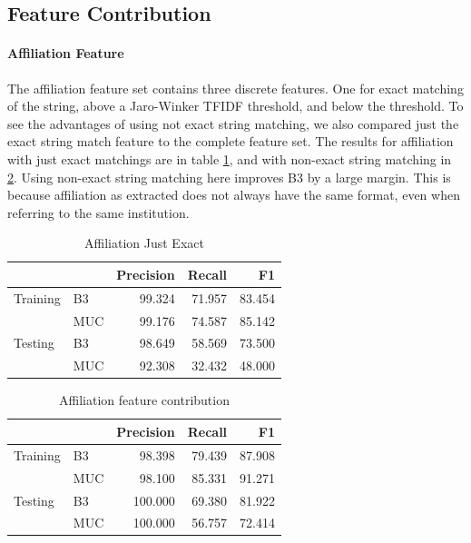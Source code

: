 \documentclass[twocolumn,letterpaper]{article}
\begin{document}
\subsection{Feature Contribution} %
\label{sub:feature_contribution}
\paragraph{Affiliation Feature} %
\label{par:affiliation_feature}
The affiliation feature set contains three discrete features. One for exact matching of the string, above a Jaro-Winker TFIDF threshold, and below the threshold. To see the advantages of using not exact string matching, we also compared just the exact string match feature to the complete feature set. The results for affiliation with just exact matchings are in table \ref{tab:exact}, and with non-exact string matching in \ref{tab:aff}. Using non-exact string matching here improves B3 by a large margin. This is because affiliation as extracted does not always have the same format, even when referring to the same institution.

\begin{table}[ht]
\centering
\begin{tabular}{l || l | r r r}
 & & Precision & Recall & F1 \\ \hline
Training & B3 & 99.324 & 71.957 & 83.454 \\
 & MUC & 99.176 & 74.587 & 85.142\\ \hline
Testing & B3 & 98.649 & 58.569 & 73.500 \\
 & MUC & 92.308 & 32.432 & 48.000 \\
\end{tabular}
\caption{Affiliation Just Exact}
\label{tab:exact}
\end{table}

\begin{table}[ht]
\centering
\begin{tabular}{l || l | r r r}
 & & Precision & Recall & F1 \\ \hline
Training & B3 & 98.398 & 79.439 & 87.908 \\
 & MUC & 98.100 & 85.331 & 91.271\\ \hline
Testing & B3 & 100.000 & 69.380 & 81.922 \\
 & MUC & 100.000 & 56.757 & 72.414 \\
\end{tabular}
\caption{Affiliation feature contribution}
\label{tab:aff}
\end{table}
\end{document}
